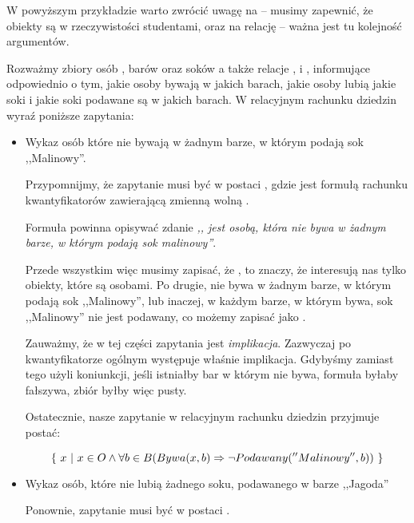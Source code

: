 W powyższym przykładzie warto zwrócić uwagę na  -- musimy zapewnić, że obiekty są w rzeczywistości studentami, oraz na relację  -- ważna jest tu kolejność argumentów.

\begin{example}
\label{example:juices-and-bars}
Rozważmy zbiory osób , barów  oraz soków  a także relacje ,  i , informujące odpowiednio o tym, jakie osoby bywają w jakich barach, jakie osoby lubią jakie soki i jakie soki podawane są w jakich barach. W relacyjnym rachunku dziedzin wyraź poniższe zapytania:

\begin{itemize}
    \item Wykaz osób które nie bywają w żadnym barze, w którym podają sok ,,Malinowy''.
    
    Przypomnijmy, że zapytanie musi być w postaci , gdzie \m{\varphi} jest formułą rachunku kwantyfikatorów zawierającą zmienną wolną . 
    
    Formuła \m{\varphi} powinna opisywać zdanie \textit{,, jest osobą, która nie bywa w żadnym barze, w którym podają sok malinowy''}. 
    
    Przede wszystkim więc musimy zapisać, że , to znaczy, że interesują nas tylko obiekty, które są osobami. Po drugie,  nie bywa w żadnym barze, w którym podają sok ,,Malinowy'', lub inaczej, w każdym barze, w którym  bywa, sok ,,Malinowy'' nie jest podawany, co możemy zapisać jako .
    
    Zauważmy, że w tej części zapytania jest \textit{implikacja}. Zazwyczaj po kwantyfikatorze ogólnym występuje właśnie implikacja. Gdybyśmy zamiast tego użyli koniunkcji, jeśli istniałby bar w którym  nie bywa, formuła byłaby fałszywa, zbiór byłby więc pusty. 
    
    Ostatecznie, nasze zapytanie w relacyjnym rachunku dziedzin przyjmuje postać:
    
    \[
        \{\ x\ |\ x \in O \wedge \forall{b \in B} (Bywa(x,b) \Rightarrow \neg Podawany(''Malinowy'',b))\ \}
    \]
    
    \item Wykaz osób, które nie lubią żadnego soku, podawanego w barze ,,Jagoda''
    
    Ponownie, zapytanie musi być w postaci .
    

\end{itemize}
\end{example}
